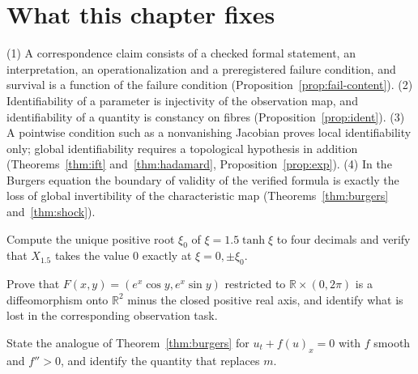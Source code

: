 \section{What this chapter fixes}

\begin{principal}
(1) A correspondence claim consists of a checked formal statement, an interpretation, an operationalization and a preregistered failure condition, and survival is a function of the failure condition (Proposition~\ref{prop:fail-content}). (2) Identifiability of a parameter is injectivity of the observation map, and identifiability of a quantity is constancy on fibres (Proposition~\ref{prop:ident}). (3) A pointwise condition such as a nonvanishing Jacobian proves local identifiability only; global identifiability requires a topological hypothesis in addition (Theorems~\ref{thm:ift} and~\ref{thm:hadamard}, Proposition~\ref{prop:exp}). (4) In the Burgers equation the boundary of validity of the verified formula is exactly the loss of global invertibility of the characteristic map (Theorems~\ref{thm:burgers} and~\ref{thm:shock}).
\end{principal}

\begin{exercise}
Compute the unique positive root $\xi_0$ of $\xi=1.5\tanh\xi$ to four decimals and verify that $X_{1.5}$ takes the value $0$ exactly at $\xi=0,\pm\xi_0$.
\end{exercise}

\begin{exercise}
Prove that $F(x,y)=(e^x\cos y,e^x\sin y)$ restricted to $\mathbb R\times(0,2\pi)$ is a diffeomorphism onto $\mathbb R^2$ minus the closed positive real axis, and identify what is lost in the corresponding observation task.
\end{exercise}

\begin{exercise}
State the analogue of Theorem~\ref{thm:burgers} for $u_t+f(u)_x=0$ with $f$ smooth and $f''>0$, and identify the quantity that replaces $m$.
\end{exercise}
